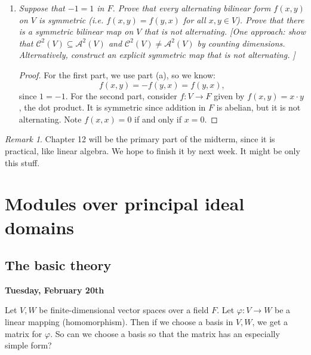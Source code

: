 \documentclass[9pt,reqno,twoside]{amsbook}
\theoremstyle{plain}
\numberwithin{section}{chapter}
\numberwithin{equation}{chapter}
\theoremstyle{definition}
\theoremstyle{remark}
\newtheorem{rem}[theorem]{Remark}
\theoremstyle{plain}
\newcommand{\sub}{\subseteq}
\newcommand{\bb}{\vspace{3mm}}
\newcommand{\mc}{\mathcal}
\renewcommand{\phi}{\varphi}
\begin{document}
\begin{enumerate}[label=\arabic*.]
\begin{enumerate}
\item \textit{Suppose that $-1 = 1$ in $F$. Prove that every alternating bilinear form $f(x,y)$ on $V$ is symmetric (i.e. $f(x,y) = f(y,x)$ for all $x,y \in V$). Prove that there is a symmetric bilinear map on $V$ that is not alternating. [One approach: show that $\mc{C}^2(V) \sub \mc{A}^2(V)$ and $\mc{C}^2(V) \neq \mc{A}^2(V)$ by counting dimensions. Alternatively, construct an explicit symmetric map that is not alternating. ]}

\begin{proof}
For the first part, we use part (a), so we know:
$$
f(x,y) = -f(y,x) = f(y,x),
$$
 since $1 = -1$. For the second part, consider $f:V \to F$ given by $f(x,y) = x \cdot y$, the dot product. It is symmetric since addition in $F$ is abelian, but it is not alternating. Note $f(x,x) = 0$ if and only if $x = 0$. 
\end{proof}


\end{enumerate}

\end{enumerate}

\begin{rem}
Chapter 12 will be the primary part of the midterm, since it is practical, like linear algebra. We hope to finish it by next week. It might be only this stuff. 
\end{rem}





\chapter{Modules over principal ideal domains}


\section{The basic theory}



\bb\bb

\textbf{Tuesday, February 20th}


Let $V,W$ be finite-dimensional vector spaces over a field $F$. Let $\phi:V \to W$ be a linear mapping (homomorphism). Then if we choose a basis in $V,W$, we get a matrix for $\phi$. So can we choose a basis so that the matrix has an especially simple form?
\end{document}
